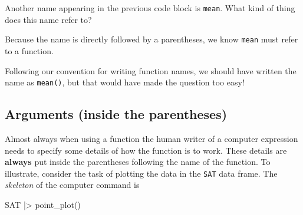\documentclass[
  letterpaper,
  DIV=11,
  numbers=noendperiod,
  oneside]{scrartcl}
\newenvironment{Shaded}{\begin{snugshade}}{\end{snugshade}}
\newcommand{\FunctionTok}[1]{\textcolor[rgb]{0.28,0.35,0.67}{#1}}
\newcommand{\NormalTok}[1]{\textcolor[rgb]{0.00,0.23,0.31}{#1}}
\newcommand{\SpecialCharTok}[1]{\textcolor[rgb]{0.37,0.37,0.37}{#1}}
\begin{document}
\begin{tcolorbox}[enhanced jigsaw, colbacktitle=quarto-callout-note-color!10!white, opacityback=0, breakable, opacitybacktitle=0.6, colback=white, coltitle=black, arc=.35mm, title=\textcolor{quarto-callout-note-color}{\faInfo}\hspace{0.5em}{Example: What does \texttt{mean} refer to?}, left=2mm, colframe=quarto-callout-note-color-frame, rightrule=.15mm, bottomrule=.15mm, leftrule=.75mm, bottomtitle=1mm, toptitle=1mm, titlerule=0mm, toprule=.15mm]

Another name appearing in the previous code block is \texttt{mean}. What
kind of thing does this name refer to?

\begin{tcolorbox}[enhanced jigsaw, colbacktitle=quarto-callout-note-color!10!white, opacityback=0, breakable, opacitybacktitle=0.6, colback=white, coltitle=black, arc=.35mm, title=\textcolor{quarto-callout-note-color}{\faInfo}\hspace{0.5em}{Answer}, left=2mm, colframe=quarto-callout-note-color-frame, rightrule=.15mm, bottomrule=.15mm, leftrule=.75mm, bottomtitle=1mm, toptitle=1mm, titlerule=0mm, toprule=.15mm]

Because the name is directly followed by a parentheses, we know
\texttt{mean} must refer to a function.

Following our convention for writing function names, we should have
written the name as \texttt{mean()}, but that would have made the
question too easy!

\end{tcolorbox}

\end{tcolorbox}

\subsection{Arguments (inside the
parentheses)}\label{arguments-inside-the-parentheses}

Almost always when using a function the human writer of a computer
expression needs to specify some details of how the function is to work.
These details are \textbf{always} put inside the parentheses following
the name of the function. To illustrate, consider the task of plotting
the data in the \texttt{SAT} data frame. The \emph{skeleton} of the
computer command is

\begin{Shaded}
\begin{Highlighting}[]
\NormalTok{SAT }\SpecialCharTok{|\textgreater{}} \FunctionTok{point\_plot}\NormalTok{()}
\end{Highlighting}
\end{Shaded}
\end{document}

